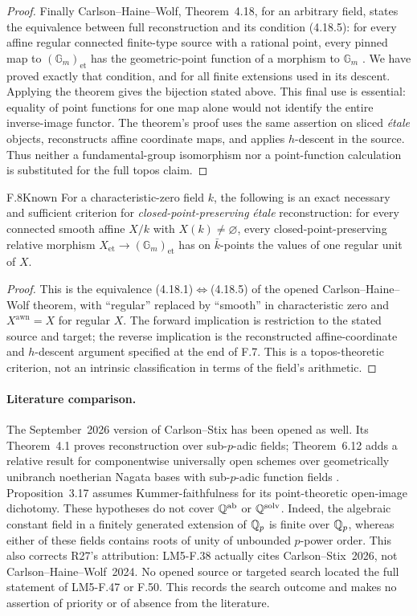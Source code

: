 \begin{proof}
Finally Carlson--Haine--Wolf, Theorem~4.18, for an arbitrary field,
states the equivalence between full reconstruction and its
condition (4.18.5): for every affine regular connected finite-type
source with a rational point, every pinned map to
$(\mathbb G_m)_{\mathrm{et}}$ has the geometric-point function
of a morphism to $\mathbb G_m$ \citep{F_CHW2024}. We have proved
exactly that condition, and for all finite extensions used in its
descent. Applying the theorem gives the bijection stated above.
This final use is essential: equality of point functions for one
map alone would not identify the entire inverse-image functor.
The theorem's proof uses the same assertion on sliced \emph{\'etale}
objects, reconstructs affine coordinate maps, and applies $h$-descent
in the source. Thus neither a fundamental-group isomorphism nor a
point-function calculation is substituted for the full topos claim.
\end{proof}

\begin{claim}{F.8}{Known}
For a characteristic-zero field $k$, the following is an exact
necessary and sufficient criterion for \emph{closed-point-preserving}
\emph{\'etale} reconstruction: for every connected smooth affine
$X/k$ with $X(k)\ne\varnothing$, every closed-point-preserving
relative morphism $X_{\mathrm{et}}\to(\mathbb G_m)_{\mathrm{et}}$
has on $\bar k$-points the values of one regular unit of $X$.
\end{claim}
\begin{proof}
This is the equivalence (4.18.1)$\Leftrightarrow$(4.18.5) of the
opened Carlson--Haine--Wolf theorem, with ``regular'' replaced by
``smooth'' in characteristic zero and
$X^{\mathrm{awn}}=X$ for regular $X$. The forward implication is
restriction to the stated source and target; the reverse implication
is the reconstructed affine-coordinate and $h$-descent argument
specified at the end of F.7. This is a topos-theoretic criterion,
not an intrinsic classification in terms of the field's arithmetic.
\end{proof}

\paragraph{Literature comparison.}
The September~2026 version of Carlson--Stix has been opened as
well. Its Theorem~4.1 proves reconstruction over sub-$p$-adic
fields; Theorem~6.12 adds a relative result for componentwise
universally open schemes over geometrically unibranch noetherian
Nagata bases with sub-$p$-adic function fields
\citep{F_CS2026}. Proposition~3.17 assumes Kummer-faithfulness
for its point-theoretic open-image dichotomy. These hypotheses
do not cover $\mathbb Q^{\mathrm{ab}}$ or $\mathbb Q^{\mathrm{solv}}$.
Indeed, the algebraic constant field in a finitely generated
extension of $\mathbb Q_p$ is finite over $\mathbb Q_p$, whereas either of
these fields contains roots of unity of unbounded $p$-power order.
This also corrects R27's attribution: LM5-F.38 actually cites
Carlson--Stix~2026, not Carlson--Haine--Wolf~2024.
No opened source or targeted search located the full statement
of LM5-F.47 or F.50. This records the search outcome and makes
no assertion of priority or of absence from the literature.

